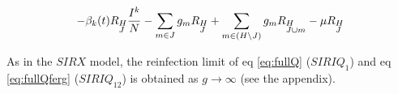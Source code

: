 \begin{footnotesize}
\begin{align}
    -\beta_k(t) R_{\begin{subarray}{l}H\\ J \end{subarray}}
    \frac{I^k}{N} - \sum_{m \in J} g_m R_{\begin{subarray}{l}H\\
        J \end{subarray}} + \sum_{m \in (H \setminus J)} g_m
    R_{\begin{subarray}{l}H\\ J\cup m \end{subarray}} -\mu
    R_{\begin{subarray}{l}H\\J \end{subarray}} \notag
  \end{align}
\end{footnotesize}

As in the $SIRX$ model, the reinfection limit of eq \eqref{eq:fullQ}
($SIRIQ_{1}$) and eq \eqref{eq:fullQferg} ($SIRIQ_{12}$) is obtained
as $g \to \infty$ (see the appendix).

